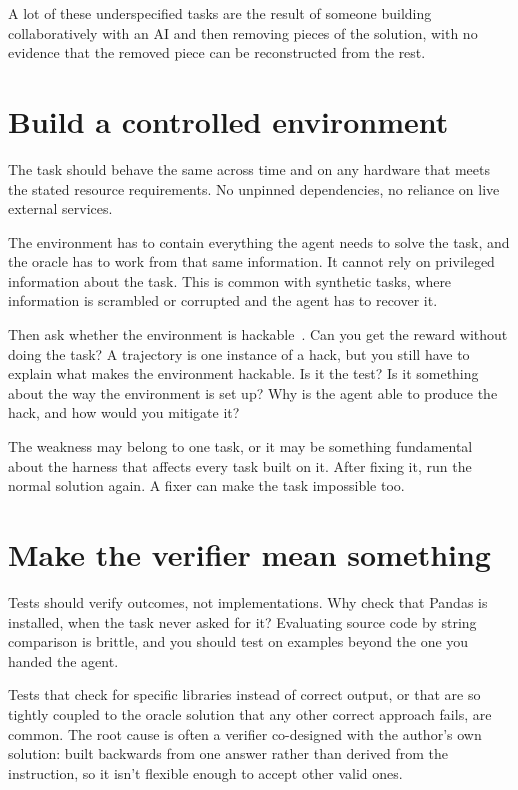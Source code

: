 \documentclass[11pt]{article}
\begin{document}
A lot of these underspecified tasks are the result of someone building collaboratively with an AI and then removing pieces of the solution, with no evidence that the removed piece can be reconstructed from the rest.

\section{Build a controlled environment}

The task should behave the same across time and on any hardware that meets the stated resource requirements. No unpinned dependencies, no reliance on live external services.

The environment has to contain everything the agent needs to solve the task, and the oracle has to work from that same information. It cannot rely on privileged information about the task. This is common with synthetic tasks, where information is scrambled or corrupted and the agent has to recover it.

Then ask whether the environment is hackable~\citep{terminal-wrench-2026,krakovna2020specification,metr2025hacking}. Can you get the reward without doing the task? A trajectory is one instance of a hack, but you still have to explain what makes the environment hackable. Is it the test? Is it something about the way the environment is set up? Why is the agent able to produce the hack, and how would you mitigate it?

The weakness may belong to one task, or it may be something fundamental about the harness that affects every task built on it. After fixing it, run the normal solution again. A fixer can make the task impossible too.

\section{Make the verifier mean something}

Tests should verify outcomes, not implementations. Why check that Pandas is installed, when the task never asked for it? Evaluating source code by string comparison is brittle, and you should test on examples beyond the one you handed the agent.

Tests that check for specific libraries instead of correct output, or that are so tightly coupled to the oracle solution that any other correct approach fails, are common. The root cause is often a verifier co-designed with the author's own solution: built backwards from one answer rather than derived from the instruction, so it isn't flexible enough to accept other valid ones.
\end{document}
